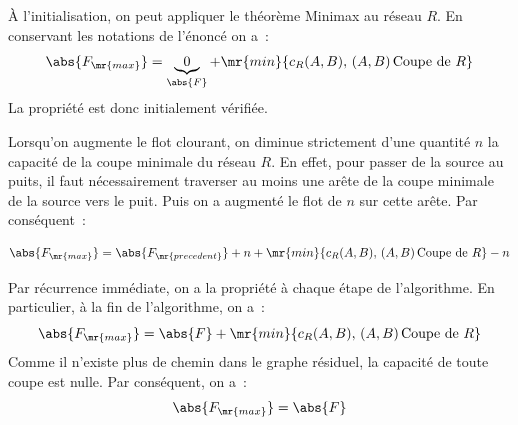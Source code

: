 À l'initialisation, on peut appliquer le théorème Minimax au réseau $R$. En conservant les notations de l'énoncé on a~:
$$ \abs{F_\mr{max}} = \underbrace{0}_{\abs{F}} + \mr{min}\{c_R(A,B),\, (A,B) \, \text{Coupe de } R\} $$
La propriété est donc initialement vérifiée.

Lorsqu'on augmente le flot clourant, on diminue strictement d'une quantité $n$  la capacité de la coupe minimale du réseau $R$. En effet, pour passer de la source au puits, il faut nécessairement traverser au moins une arête de la coupe minimale de la source vers le puit. Puis on a augmenté le flot de $n$ sur cette arête. Par conséquent~:

$$ \abs{F_\mr{max}} = \abs{F_\mr{precedent}} + n + \mr{min}\{c_R(A,B),\, (A,B) \, \text{Coupe de } R\} - n $$

Par récurrence immédiate, on a la propriété à chaque étape de l'algorithme. En particulier, à la fin de l'algorithme, on a~:
$$ \abs{F_\mr{max}} = \abs{F} + \mr{min}\{c_R(A,B),\, (A,B) \, \text{Coupe de } R\} $$
Comme il n'existe plus de chemin dans le graphe résiduel, la capacité de toute coupe est nulle. Par conséquent, on a~:
$$ \abs{F_\mr{max}} = \abs{F}$$